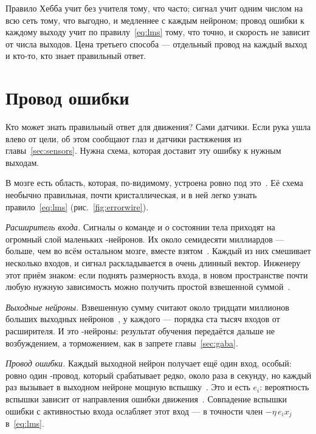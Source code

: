 \begin{keyblock}
\begin{proposition}
\label{prop:teachers}
Правило Хебба учит без учителя тому, что часто; сигнал  учит одним числом на всю сеть тому, что выгодно, и медленнее с каждым нейроном; провод ошибки к каждому выходу учит по правилу~\eqref{eq:lms} тому, что точно, и скорость не зависит от числа выходов. Цена третьего способа --- отдельный провод на каждый выход и кто-то, кто знает правильный ответ.
\end{proposition}
\end{keyblock}

\section{Провод ошибки}

Кто может знать правильный ответ для движения? Сами датчики. Если рука ушла влево от цели, об этом сообщают глаз и датчики растяжения из главы~\ref{sec:sensors}. Нужна схема, которая доставит эту ошибку к нужным выходам.

В мозге есть область, которая, по-видимому, устроена ровно под это~\cite{Marr1969,Albus1971}. Её схема необычно правильная, почти кристаллическая, и в ней легко узнать правило~\eqref{eq:lms} (рис.~\ref{fig:errorwire}).

\emph{Расширитель входа.} Сигналы о команде и о состоянии тела приходят на огромный слой маленьких -нейронов. Их около семидесяти миллиардов --- больше, чем во всём остальном мозге, вместе взятом~\cite{Azevedo2009}. Каждый из них смешивает несколько входов, и сигнал раскладывается в очень длинный вектор. Инженеру этот приём знаком: если поднять размерность входа, в новом пространстве почти любую нужную зависимость можно получить простой взвешенной суммой~\cite{Cover1965}.

\emph{Выходные нейроны.} Взвешенную сумму считают около тридцати миллионов больших выходных нейронов~\cite{Andersen1992cereb}, у каждого --- порядка ста тысяч входов от расширителя. И это -нейроны: результат обучения передаётся дальше не возбуждением, а торможением, как в запрете главы~\ref{sec:gaba}.

\emph{Провод ошибки.} Каждый выходной нейрон получает ещё один вход, особый: ровно один -провод, который срабатывает редко, около раза в секунду, но каждый раз вызывает в выходном нейроне мощную вспышку~\cite{Ito2001}. Это и есть $e_i$: вероятность вспышки зависит от направления ошибки движения~\cite{Herzfeld2018}. Совпадение вспышки ошибки с активностью входа ослабляет этот вход --- в точности член $-\eta\,e_i x_j$ в~\eqref{eq:lms}.

